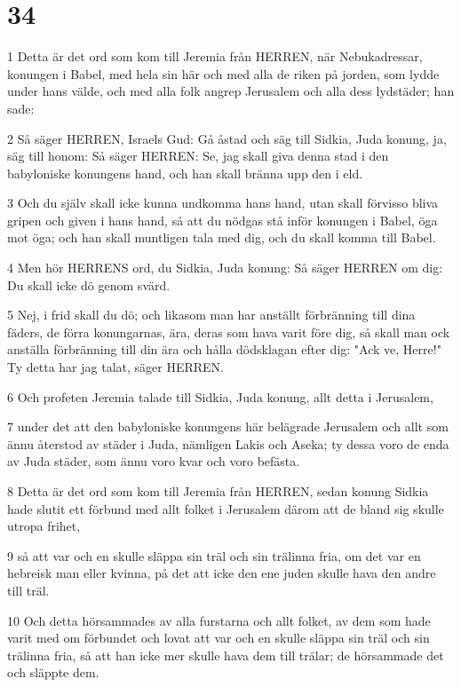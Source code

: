 \chapter{34}

\par 1 Detta är det ord som kom till Jeremia från HERREN, när Nebukadressar, konungen i Babel, med hela sin här och med alla de riken på jorden, som lydde under hans välde, och med alla folk angrep Jerusalem och alla dess lydstäder; han sade:
\par 2 Så säger HERREN, Israels Gud: Gå åstad och säg till Sidkia, Juda konung, ja, säg till honom: Så säger HERREN: Se, jag skall giva denna stad i den babyloniske konungens hand, och han skall bränna upp den i eld.
\par 3 Och du själv skall icke kunna undkomma hans hand, utan skall förvisso bliva gripen och given i hans hand, så att du nödgas stå inför konungen i Babel, öga mot öga; och han skall muntligen tala med dig, och du skall komma till Babel.
\par 4 Men hör HERRENS ord, du Sidkia, Juda konung: Så säger HERREN om dig: Du skall icke dö genom svärd.
\par 5 Nej, i frid skall du dö; och likasom man har anställt förbränning till dina fäders, de förra konungarnas, ära, deras som hava varit före dig, så skall man ock anställa förbränning till din ära och hålla dödsklagan efter dig: "Ack ve, Herre!" Ty detta har jag talat, säger HERREN.
\par 6 Och profeten Jeremia talade till Sidkia, Juda konung, allt detta i Jerusalem,
\par 7 under det att den babyloniske konungens här belägrade Jerusalem och allt som ännu återstod av städer i Juda, nämligen Lakis och Aseka; ty dessa voro de enda av Juda städer, som ännu voro kvar och voro befästa.
\par 8 Detta är det ord som kom till Jeremia från HERREN, sedan konung Sidkia hade slutit ett förbund med allt folket i Jerusalem därom att de bland sig skulle utropa frihet,
\par 9 så att var och en skulle släppa sin träl och sin trälinna fria, om det var en hebreisk man eller kvinna, på det att icke den ene juden skulle hava den andre till träl.
\par 10 Och detta hörsammades av alla furstarna och allt folket, av dem som hade varit med om förbundet och lovat att var och en skulle släppa sin träl och sin trälinna fria, så att han icke mer skulle hava dem till trälar; de hörsammade det och släppte dem.
